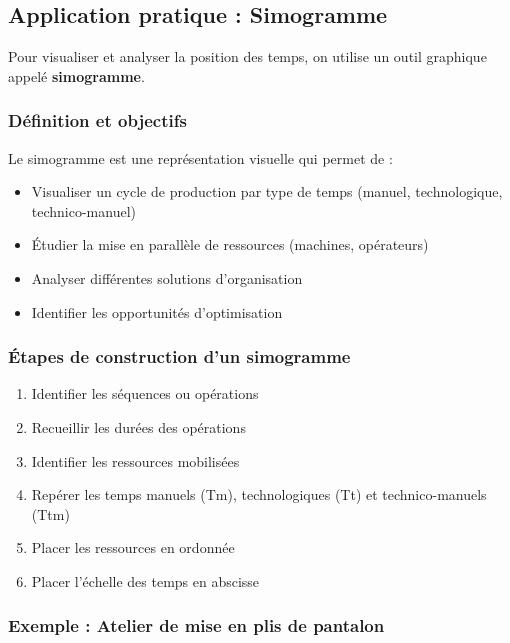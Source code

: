 \documentclass[a4paper,12pt]{article}
\begin{document}
\subsection{Application pratique : Simogramme}

Pour visualiser et analyser la position des temps, on utilise un outil graphique appelé \textbf{simogramme}.

\subsubsection{Définition et objectifs}

Le simogramme est une représentation visuelle qui permet de :
\begin{itemize}
    \item Visualiser un cycle de production par type de temps (manuel, technologique, technico-manuel)
    \item Étudier la mise en parallèle de ressources (machines, opérateurs)
    \item Analyser différentes solutions d'organisation
    \item Identifier les opportunités d'optimisation
\end{itemize}

\subsubsection{Étapes de construction d'un simogramme}

\begin{enumerate}
    \item Identifier les séquences ou opérations
    \item Recueillir les durées des opérations
    \item Identifier les ressources mobilisées
    \item Repérer les temps manuels (Tm), technologiques (Tt) et technico-manuels (Ttm)
    \item Placer les ressources en ordonnée
    \item Placer l'échelle des temps en abscisse
\end{enumerate}

\subsubsection{Exemple : Atelier de mise en plis de pantalon}
\end{document}
